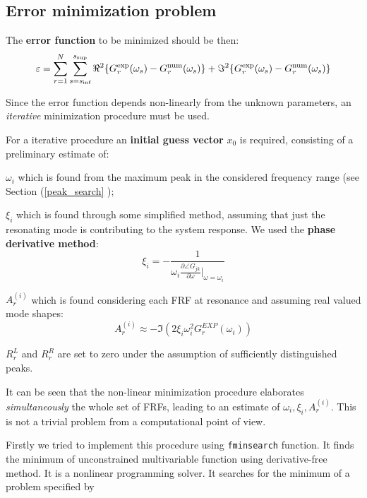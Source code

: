 \documentclass[a4paper,12pt,oneside]{article}
\begin{document}
\subsection{Error minimization problem}

The \textbf{error function} to be minimized should be then:
\begin{equation}
\label{eqn:error_fun} 
	\varepsilon = 
		\sum_{r=1}^{N}
		\sum_{s=s_\textup{inf}}^{s_\textup{sup}}
		\Re^2\{G^\textup{exp}_r(\omega_s) - G^\textup{num}_r(\omega_s)\} +
		\Im^2\{G^\textup{exp}_r(\omega_s) - G^\textup{num}_r(\omega_s)\}
\end{equation}

Since the error function depends non-linearly from the unknown parameters, an \textsl{iterative} minimization procedure must be used.

For a iterative procedure an \textbf{initial guess vector} $x_0$ is required, consisting of a preliminary estimate of:

\begin{list}{•}{}
\item $\omega_i$  which is found from the maximum peak in the considered frequency range (see Section (\ref{peak_search} );
\item $\xi_i$ which is found through some simplified method, assuming that just the
resonating mode is contributing to the system response. We used the \textbf{phase derivative method}:
\[
\xi_i = - \frac{1}{\omega_i \frac{\partial \angle G_{jk}}{\partial \omega}\vert_{\omega = \omega_i}}
\]
 
\item $A_r^{(i)}$ which is found considering each FRF at resonance and assuming real valued mode shapes:
\[
A_r^{(i)} \approx - \Im (2 \xi_i \omega_i^2 G_r^{EXP}(\omega_i))
\]
\item $R_r^L$ and $R_r^R$ are set to zero under the assumption of sufficiently distinguished peaks.
\end{list}

It can be seen that the non-linear minimization procedure elaborates \textsl{simultaneously} the whole set of FRFs, leading to an estimate of $\omega_i, \xi_i , A^{(i)}_r $.
This is not a trivial problem from a computational point of view.

Firstly we tried to implement this procedure using \texttt{fminsearch} function. It finds the minimum of unconstrained multivariable function using derivative-free method. It is a nonlinear programming solver. It searches for the minimum of a problem specified by
\end{document}
